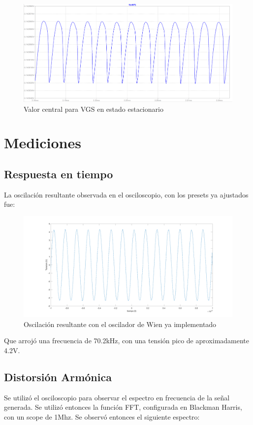 \documentclass[../../tc_tp6_main.tex]{subfiles}
\begin{document}
\begin{figure}[H]	
	\centering
	\includegraphics[scale=0.5]{imagenes/oscilaciones_vgs.png}
	\caption{Valor central para VGS en estado estacionario}
	\label{fig:ej1_oscilaciones_vgs}
\end{figure}

\section{Mediciones}

\subsection{Respuesta en tiempo}
La oscilación resultante observada en el osciloscopio, con los presets ya ajustados fue:
\begin{figure}[H]	
	\centering
	\includegraphics[scale=0.2]{imagenes/oscilacion.png}
	\caption{Oscilación resultante con el oscilador de Wien ya implementado}
	\label{fig:ej1_oscilacion}
\end{figure}
Que arrojó una frecuencia de 70.2kHz, con una tensión pico de aproximadamente 4.2V.

\subsection{Distorsión Armónica}
Se utilizó el osciloscopio para observar el espectro en frecuencia de la señal generada. Se utilizó entonces la función FFT, configurada en Blackman Harris, con un scope de 1Mhz.
Se observó entonces el siguiente espectro: 
\end{document}
